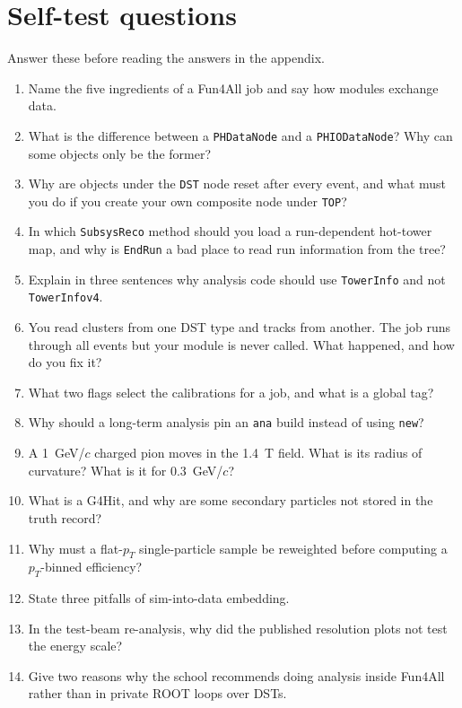\documentclass[11pt,letterpaper]{article}
\begin{document}
\section{Self-test questions}
Answer these before reading the answers in the appendix.
\begin{enumerate}[label=Q\arabic*.]
\item Name the five ingredients of a Fun4All job and say how modules exchange data.
\item What is the difference between a \texttt{PHDataNode} and a \texttt{PHIODataNode}? Why can some objects only be the former?
\item Why are objects under the \texttt{DST} node reset after every event, and what must you do if you create your own composite node under \texttt{TOP}?
\item In which \texttt{SubsysReco} method should you load a run-dependent hot-tower map, and why is \texttt{EndRun} a bad place to read run information from the tree?
\item Explain in three sentences why analysis code should use \texttt{TowerInfo} and not \texttt{TowerInfov4}.
\item You read clusters from one DST type and tracks from another. The job runs through all events but your module is never called. What happened, and how do you fix it?
\item What two flags select the calibrations for a job, and what is a global tag?
\item Why should a long-term analysis pin an \texttt{ana} build instead of using \texttt{new}?
\item A 1~GeV/$c$ charged pion moves in the 1.4~T field. What is its radius of curvature? What is it for 0.3~GeV/$c$?
\item What is a G4Hit, and why are some secondary particles not stored in the truth record?
\item Why must a flat-$p_T$ single-particle sample be reweighted before computing a $p_T$-binned efficiency?
\item State three pitfalls of sim-into-data embedding.
\item In the test-beam re-analysis, why did the published resolution plots not test the energy scale?
\item Give two reasons why the school recommends doing analysis inside Fun4All rather than in private ROOT loops over DSTs.
\end{enumerate}
\end{document}

